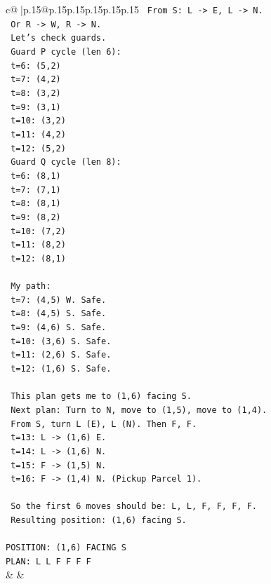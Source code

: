 \documentclass{article}
\begin{document}
{\begin{supertabular}{c@{$\;$}|p{.15\linewidth}@{}p{.15\linewidth}p{.15\linewidth}p{.15\linewidth}p{.15\linewidth}p{.15\linewidth}}
{{{\texttt{   From S: L {-}> E, L {-}> N.} \\
\texttt{   Or R {-}> W, R {-}> N.} \\
\texttt{   Let's check guards.} \\
\texttt{   Guard P cycle (len 6):} \\
\texttt{   t=6: (5,2)} \\
\texttt{   t=7: (4,2)} \\
\texttt{   t=8: (3,2)} \\
\texttt{   t=9: (3,1)} \\
\texttt{   t=10: (3,2)} \\
\texttt{   t=11: (4,2)} \\
\texttt{   t=12: (5,2)} \\
\texttt{   Guard Q cycle (len 8):} \\
\texttt{   t=6: (8,1)} \\
\texttt{   t=7: (7,1)} \\
\texttt{   t=8: (8,1)} \\
\texttt{   t=9: (8,2)} \\
\texttt{   t=10: (7,2)} \\
\texttt{   t=11: (8,2)} \\
\texttt{   t=12: (8,1)} \\
\\ 
\texttt{   My path:} \\
\texttt{   t=7: (4,5) W. Safe.} \\
\texttt{   t=8: (4,5) S. Safe.} \\
\texttt{   t=9: (4,6) S. Safe.} \\
\texttt{   t=10: (3,6) S. Safe.} \\
\texttt{   t=11: (2,6) S. Safe.} \\
\texttt{   t=12: (1,6) S. Safe.} \\
\\ 
\texttt{   This plan gets me to (1,6) facing S.} \\
\texttt{   Next plan: Turn to N, move to (1,5), move to (1,4).} \\
\texttt{   From S, turn L (E), L (N). Then F, F.} \\
\texttt{   t=13: L {-}> (1,6) E.} \\
\texttt{   t=14: L {-}> (1,6) N.} \\
\texttt{   t=15: F {-}> (1,5) N.} \\
\texttt{   t=16: F {-}> (1,4) N. (Pickup Parcel 1).} \\
\\ 
\texttt{   So the first 6 moves should be: L, L, F, F, F, F.} \\
\texttt{   Resulting position: (1,6) facing S.} \\
\\ 
\texttt{POSITION: (1,6) FACING S} \\
\texttt{PLAN: L L F F F F} \\
            }
        }
    }
    & & \\ \\


\end{supertabular}}
\end{document}
